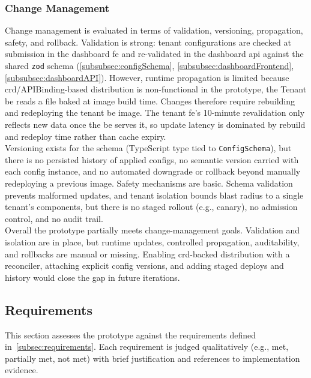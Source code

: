 \documentclass[11pt, a4paper, oneside, listof=totoc]{scrartcl}
\begin{document}
            \subsubsection{Change Management}\label{subsubsec:evalChangeManagement}
                Change management is evaluated in terms of validation, versioning, propagation,
                safety, and rollback.
                Validation is strong: tenant configurations are checked at submission in the
                dashboard \gls{fe} and re-validated in the dashboard \gls{api} against the shared
                \texttt{zod} schema (\autoref{subsubsec:configSchema},
                \autoref{subsubsec:dashboardFrontend}, \autoref{subsubsec:dashboardAPI}).
                However, runtime propagation is limited because \gls{crd}/APIBinding-based
                distribution is non-functional in the prototype, the Tenant \gls{be} reads a file
                baked at image build time.
                Changes therefore require rebuilding and redeploying the tenant \gls{be} image.
                The tenant \gls{fe}'s 10-minute revalidation only reflects new data once the
                \gls{be} serves it, so update latency is dominated by rebuild and redeploy time
                rather than cache expiry.\\
                Versioning exists for the schema (TypeScript type tied to \texttt{ConfigSchema}),
                but there is no persisted history of applied configs, no semantic version carried
                with each config instance, and no automated downgrade or rollback beyond manually
                redeploying a previous image.
                Safety mechanisms are basic.
                Schema validation prevents malformed updates, and tenant isolation bounds blast
                radius to a single tenant's components, but there is no staged rollout
                (e.g., canary), no admission control, and no audit trail.\\
                Overall the prototype partially meets change-management goals.
                Validation and isolation are in place, but runtime updates, controlled propagation,
                auditability, and rollbacks are manual or missing.
                Enabling \gls{crd}-backed distribution with a reconciler, attaching explicit config
                versions, and adding staged deploys and history would close the gap in future
                iterations.

        \subsection{Requirements}\label{subsec:evalRequirements}
            This section assesses the prototype against the requirements defined
            in~\autoref{subsec:requirements}.
            Each requirement is judged qualitatively (e.g., met, partially met, not met) with brief
            justification and references to implementation evidence.
\end{document}
